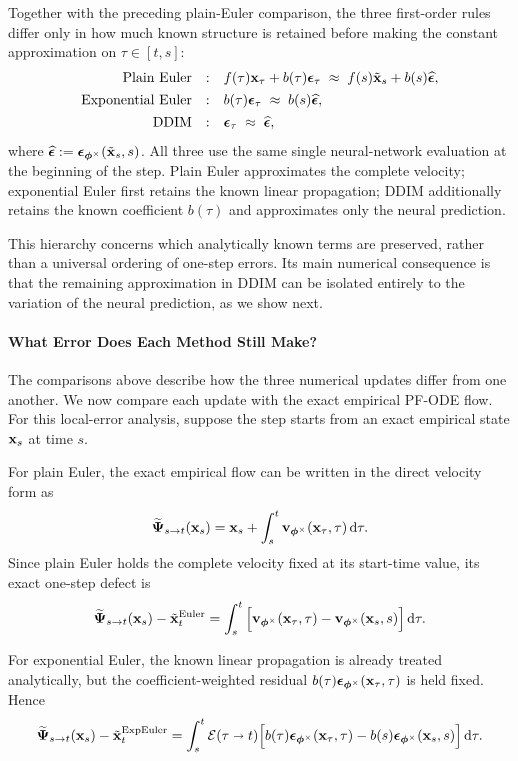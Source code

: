 Together with the preceding plain-Euler comparison, the three first-order
rules differ only in how much known structure is retained before making the
constant approximation on $\tau\in[t,s]$:
\[
\begin{array}{rcl}
\text{Plain Euler}
&:&
f(\tau){\mathbf{x}}_\tau+b(\tau){\bm{\epsilon}}_\tau
\;\approx\;
f(s)\tilde{{\mathbf{x}}}_s+b(s)\widehat{{\bm{\epsilon}}},
\\[4pt]
\text{Exponential Euler}
&:&
b(\tau){\bm{\epsilon}}_\tau
\;\approx\;
b(s)\widehat{{\bm{\epsilon}}},
\\[4pt]
\text{DDIM}
&:&
{\bm{\epsilon}}_\tau
\;\approx\;
\widehat{{\bm{\epsilon}}},
\end{array}
\]
where
$\widehat{{\bm{\epsilon}}}
:=
{\bm{\epsilon}}_{\bm{\phi}^\times}(\tilde{{\mathbf{x}}}_s,s)$.
All three use the same single neural-network evaluation at the beginning of
the step. Plain Euler approximates the complete velocity; exponential Euler
first retains the known linear propagation; DDIM additionally retains the
known coefficient $b(\tau)$ and approximates only the neural prediction.

This hierarchy concerns which analytically known terms are preserved, rather
than a universal ordering of one-step errors. Its main numerical consequence
is that the remaining approximation in DDIM can be isolated entirely to the
variation of the neural prediction, as we show next.



\paragraph{What Error Does Each Method Still Make?}
The comparisons above describe how the three numerical updates differ from one
another. We now compare each update with the exact empirical PF-ODE flow.
For this local-error analysis, suppose the step starts from an exact empirical
state ${\mathbf{x}}_s$ at time $s$.

For plain Euler, the exact empirical flow can be written in the direct velocity
form as
\[
\widetilde{{\bm{\Psi}}}_{s\to t}({\mathbf{x}}_s)
=
{\mathbf{x}}_s
+
\int_s^t
{\mathbf{v}}_{\bm{\phi}^\times}({\mathbf{x}}_\tau,\tau)
\mathop{}\!\mathrm{d}\tau.
\]
Since plain Euler holds the complete velocity fixed at its start-time value,
its exact one-step defect is
\begin{align*}
\widetilde{{\bm{\Psi}}}_{s\to t}({\mathbf{x}}_s)
-
\tilde{{\mathbf{x}}}_t^{\mathrm{Euler}}
=
\int_s^t
\Big[
{\mathbf{v}}_{\bm{\phi}^\times}({\mathbf{x}}_\tau,\tau)
-
{\mathbf{v}}_{\bm{\phi}^\times}({\mathbf{x}}_s,s)
\Big]
\mathop{}\!\mathrm{d}\tau.
\end{align*}

For exponential Euler, the known linear propagation is already treated
analytically, but the coefficient-weighted residual
$b(\tau){\bm{\epsilon}}_{\bm{\phi}^\times}({\mathbf{x}}_\tau,\tau)$ is held fixed. Hence
\begin{align*}
\widetilde{{\bm{\Psi}}}_{s\to t}({\mathbf{x}}_s)
-
\tilde{{\mathbf{x}}}_t^{\mathrm{ExpEuler}}
=
\int_s^t
\mathcal E(\tau\shortrightarrow t)
\Big[
b(\tau)
{\bm{\epsilon}}_{\bm{\phi}^\times}({\mathbf{x}}_\tau,\tau)
-
b(s)
{\bm{\epsilon}}_{\bm{\phi}^\times}({\mathbf{x}}_s,s)
\Big]
\mathop{}\!\mathrm{d}\tau.
\end{align*}


